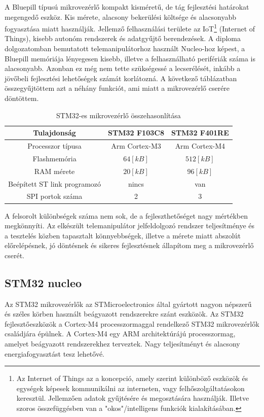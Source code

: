 A Bluepill típusú mikrovezérlő kompakt kisméretű, de tág fejlesztési határokat megengedő eszköz. Kis mérete, alacsony bekerülési költsége és alacsonyabb fogyasztása miatt használják. Jellemző felhasználási területe az IoT\footnote{Az Internet of Things az a koncepció, amely szerint különböző eszközök és egységek képesek kommunikálni az interneten, vagy felhőszolgáltatásokon keresztül. Jellemzően adatok gyűjtésére és megosztására használják. Illetve szoros összefüggésben van a "okos"/intelligens funkciók kialakításában.} (Internet of Things), kisebb autonóm rendszerek és adatgyűjtő berendezések. A diploma dolgozatomban bemutatott telemanipulátorhoz használt Nucleo-hoz képest, a Bluepill memóriája lényegesen kisebb, illetve a felhasználható perifériák száma is alacsonyabb. Azonban ez még nem tette szükségessé a lecserélését, inkább a jövőbeli fejlesztési lehetőségek számát korlátozná. A következő táblázatban összegyűjtöttem azt a néhány funkciót, ami miatt a mikrovezérlő cserére döntöttem.

\begin{table}[!h]
\begin{center}
    \begin{tabular}{|c|c|c|} 
        \hline
        Tulajdonság & STM32 F103C8 & STM32 F401RE  \\ 
        \hline
        Processzor típusa     &  Arm Cortex-M3  &  Arm Cortex-M4  \\
        Flashmemória          & $64[kB]$        & $512[kB]$       \\
        RAM mérete            & $20[kB]$    	& $96[kB]$        \\
        Beépített ST link programozó  & nincs           & van             \\
        SPI portok száma      & 2               & 3               \\
        \hline
    \end{tabular}
    \caption{STM32-es mikrovezérlő összehasonlítása}
\end{center}
\end{table}

A felsorolt különbségek száma nem sok, de a fejleszthetőséget nagy mértékben megkönnyíti. Az elkészült telemanipulátor jelfeldolgozó rendszer teljesítménye és a tesztelés közben tapasztalt könnyebbségek, illetve a mérete miatt abszolút előrelépésnek, jó döntésnek és sikeres fejlesztésnek állapítom meg a mikrovezérlő cserét.


\subsection{STM32 nucleo}
\label{sec:STM32_nucleo}
Az STM32 mikrovezérlők az STMicroelectronics által gyártott nagyon népszerű és széles körben használt beágyazott rendszerekre szánt eszközök. Az STM32 fejlesztőeszközök a Cortex-M4 processzormaggal rendelkező STM32 mikrovezérlők családjára épülnek. A Cortex-M4 egy ARM architektúrájú processzormag, amelyet beágyazott rendszerekhez terveztek. Nagy teljesítményt és alacsony energiafogyasztást tesz lehetővé.\cite{stm32doku}

